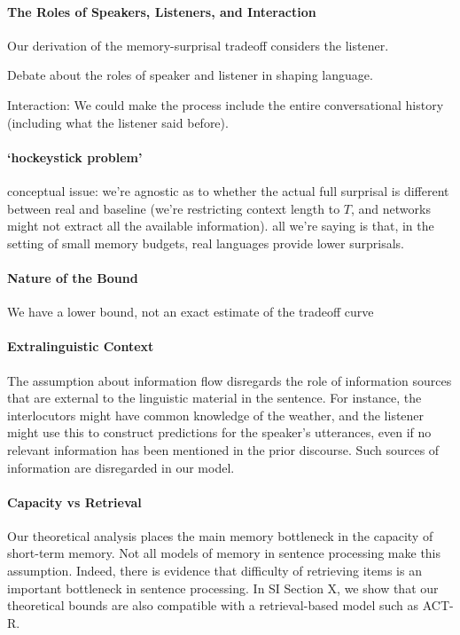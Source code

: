 \paragraph{The Roles of Speakers, Listeners, and Interaction}
Our derivation of the memory-surprisal tradeoff considers the listener.

Debate about the roles of speaker and listener in shaping language.

Interaction: We could make the process include the entire conversational history (including what the listener said before).


\paragraph{`hockeystick problem'} conceptual issue: we're agnostic as to whether the actual full surprisal is different between real and baseline (we're restricting context length to $T$, and networks might not extract all the available information). all we're saying is that, in the setting of small memory budgets, real languages provide lower surprisals.

\paragraph{Nature of the Bound}
We have a lower bound, not an exact estimate of the tradeoff curve

\paragraph{Extralinguistic Context}
The assumption about information flow disregards the role of information sources that are external to the linguistic material in the sentence.
For instance, the interlocutors might have common knowledge of the weather, and the listener might use this to construct predictions for the speaker's utterances, even if no relevant information has been mentioned in the prior discourse.
Such sources of information are disregarded in our model.

\paragraph{Capacity vs Retrieval}
Our theoretical analysis places the main memory bottleneck in the capacity of short-term memory.
Not all models of memory in sentence processing make this assumption.
Indeed, there is evidence that difficulty of retrieving items is an important bottleneck in sentence processing.
In SI Section X, we show that our theoretical bounds are also compatible with a retrieval-based model such as ACT-R.



